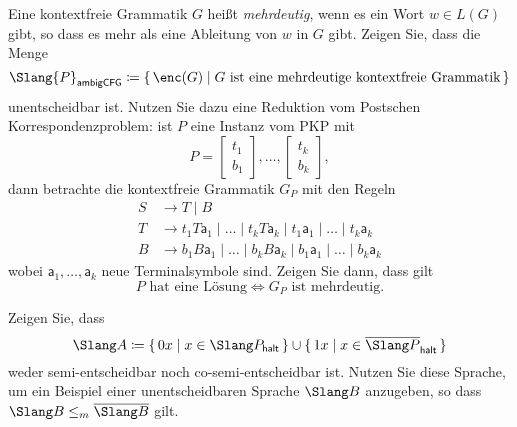 \documentclass[german]{latteachCD}[2017/03/28]
\begin{document}
\begin{exercise}
  Eine kontextfreie Grammatik $G$ heißt \emph{mehrdeutig}, wenn es ein Wort $w
  \in L(G)$ gibt, so dass es mehr als eine Ableitung von $w$ in $G$ gibt.
  Zeigen Sie, dass die Menge
  \begin{equation*}
    \Slang{P}_{\mathsf{ambigCFG}} \coloneqq \{\, \enc(G) \mid G \text{ ist eine
      mehrdeutige kontextfreie Grammatik}\,\}
  \end{equation*}
  unentscheidbar ist.  Nutzen Sie dazu eine Reduktion vom Postschen
  Korrespondenzproblem: ist $P$ eine Instanz vom PKP mit
  \def\BB#1{\begin{bmatrix}#1\end{bmatrix}}
  \begin{equation*}
    P = \BB{t_{1}\\b_{1}}, \dots, \BB{t_{k}\\b_{k}},
  \end{equation*}
  dann betrachte die kontextfreie Grammatik $G_{P}$ mit den Regeln
  \begin{align*}
    S &\to T \mid B\\
    T &\to t_{1}T\mathsf{a}_{1} \mid \dots \mid t_{k}T\mathsf{a}_{k} \mid
        t_{1}\mathsf{a}_{1} \mid \dots \mid t_{k}\mathsf{a}_{k}\\
    B &\to b_{1}B\mathsf{a}_{1} \mid \dots \mid b_{k}B\mathsf{a}_{k} \mid
        b_{1}\mathsf{a}_{1} \mid \dots \mid b_{k}\mathsf{a}_{k}
  \end{align*}
  wobei $\mathsf{a}_{1}, \dots, \mathsf{a}_{k}$ neue Terminalsymbole sind.
  Zeigen Sie dann, dass gilt
  \begin{equation*}
    P \text{ hat eine Lösung} \iff G_{P} \text{ ist mehrdeutig}.
  \end{equation*}
\end{exercise}

\begin{exercise}
  Zeigen Sie, dass
  \begin{equation*}
    \Slang A \coloneqq \{\,0x \mid x \in \Slang P_{\mathsf{halt}} \,\} \cup \{\,
    1x \mid x \in \overline{\Slang P}_{\mathsf{halt}}\,\}
  \end{equation*}
  weder semi-entscheidbar noch co-semi-entscheidbar ist.  Nutzen Sie diese
  Sprache, um ein Beispiel einer unentscheidbaren Sprache $\Slang B$ anzugeben,
  so dass $\Slang B \leq_{m} \overline{\Slang B}$ gilt.
\end{exercise}
\end{document}
